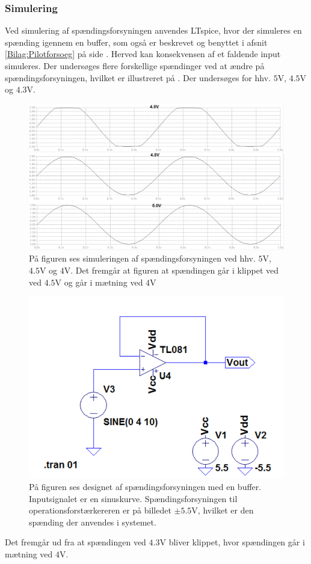 \subsubsection{Simulering}
Ved simulering af spændingsforsyningen anvendes LTspice, hvor der simuleres en spænding igennem en buffer, som også er beskrevet og benyttet i afsnit \ref{Bilag:Pilotforsoeg} på side \pageref{Bilag:Pilotforsoeg}. Herved kan konsekvensen af et faldende input simuleres. Der undersøges flere forskellige spændinger ved at ændre på spændingsforsyningen, hvilket er illustreret på . Der undersøges for hhv. $5$V, $4.5$V og $4.3$V.
\begin{figure}[H]
	\centering
	\includegraphics[scale=0.4]{figures/cProblemloesning/Spaendingsforsyning.PNG}
	\caption{På figuren ses simuleringen af spændingsforsyningen ved hhv. $5$V, $4.5$V og $4$V. Det fremgår at figuren at spændingen går i klippet ved ved $4.5$V og går i mætning ved $4$V}
	\label{fig:spaendingsforsyning_graf}
\end{figure}
\begin{figure}[H]
	\centering
	\includegraphics[scale=0.5]{figures/cProblemloesning/Spaendingsforsyning_LTspice.PNG}
	\caption{På figuren ses designet af spændingsforsyningen med en buffer. Inputsignalet er en sinuskurve. Spændingsforsyningen til operationsforstærkereren er på billedet $\pm5.5$V, hvilket er den spænding der anvendes i systemet.}
	\label{fig:spaendingsforsyning}
\end{figure}
Det fremgår ud fra  at spændingen ved $4.3$V bliver klippet, hvor spændingen går i mætning ved $4$V. 


